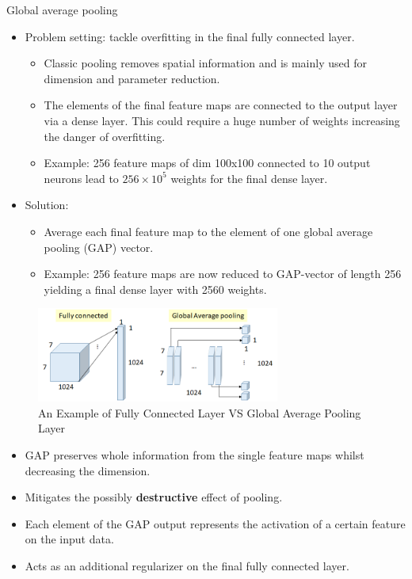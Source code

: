\begin{vbframe}{Global average pooling}
    \begin{itemize}
        \item Problem setting: tackle overfitting in the final fully connected layer.
        \begin{itemize}
        \item Classic pooling removes spatial information and is mainly used for dimension and parameter reduction.
        \item The elements of the final feature maps are connected to the output layer via a dense layer. This could require a huge number of weights increasing the danger of overfitting.
        \item Example: 256 feature maps of dim 100x100 connected to 10 output neurons lead to $256\times 10^5$ weights for the final dense layer.
        \end{itemize}
        

\framebreak 

        \item Solution: 
        \begin{itemize}
            \item Average each final feature map to the element of one global average pooling (GAP) vector.
            \item Example: 256 feature maps are now reduced to GAP-vector of length 256 yielding a final dense layer with 2560 weights.
        \end{itemize}
    \end{itemize}

    \begin{figure}
        \centering
        \includegraphics[width=8cm]{plots/moderncnn/GAP.png}
        \small{\caption{An Example of Fully Connected Layer VS Global Average Pooling Layer}}
    \end{figure}

\framebreak

    \begin{itemize}
        \item GAP preserves whole information from the single feature maps whilst decreasing the dimension.
        \item Mitigates the possibly \textbf{destructive} effect of pooling.
        \item Each element of the GAP output represents the activation of a certain feature on the input data.
        \item Acts as an additional regularizer on the final fully connected layer.
    \end{itemize}

\end{vbframe}


